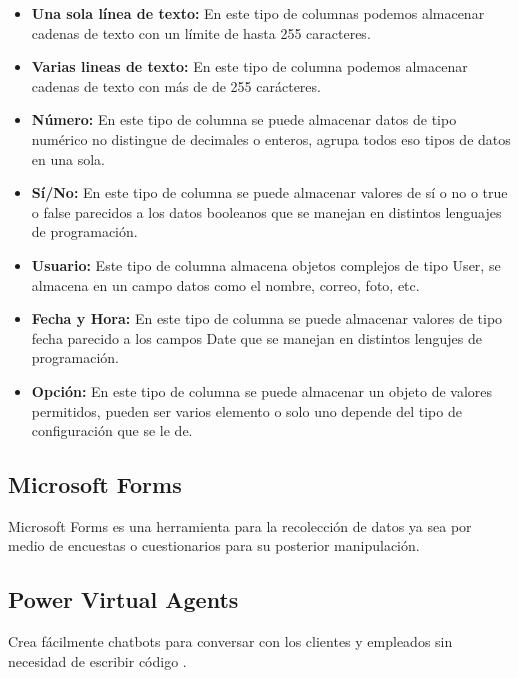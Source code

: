 \begin{itemize}
	\item \textbf{Una sola línea de texto: }En este tipo de columnas podemos almacenar cadenas de texto con un límite de hasta 255 caracteres.
	\item \textbf{Varias lineas de texto: }En este tipo de columna podemos almacenar cadenas de texto con más de de 255 carácteres.
	\item \textbf{Número: }En este tipo de columna se puede almacenar datos de tipo numérico no distingue de decimales o enteros, agrupa todos eso tipos de datos en una sola.
	\item \textbf{Sí/No: }En este tipo de columna se puede almacenar valores de sí o no o true o false parecidos a los datos booleanos que se manejan en distintos lenguajes de programación.
	\item \textbf{Usuario: }Este tipo de columna almacena objetos complejos de tipo User, se almacena en un campo datos como el nombre, correo, foto, etc.
	\item \textbf{Fecha y Hora: } En este tipo de columna se puede almacenar valores de tipo fecha parecido a los campos Date que se manejan en distintos lengujes de programación.
	\item \textbf{Opción: }En este tipo de columna se puede almacenar un objeto de valores permitidos, pueden ser varios elemento o solo uno depende del tipo de configuración que se le de.
\end{itemize}

\subsection{Microsoft Forms}
Microsoft Forms es una herramienta para la recolección de datos ya sea por medio de encuestas o
cuestionarios para su posterior manipulación.
\subsection{Power Virtual Agents}
Crea fácilmente chatbots para conversar con los clientes y empleados sin necesidad de escribir
código \citet{Pearson2020}.